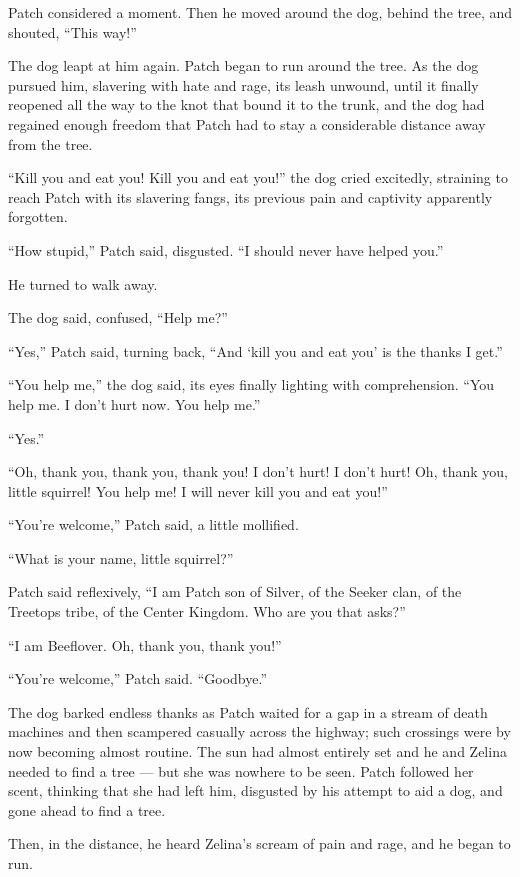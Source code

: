 \documentclass[ebook,oneside,openany,17pt]{memoir}
\begin{document}
Patch considered a moment. Then he moved around the dog, behind the
tree, and shouted, “This way!”

The dog leapt at him again. Patch began to run around the tree. As the
dog pursued him, slavering with hate and rage, its leash unwound,
until it finally reopened all the way to the knot that bound it to the
trunk, and the dog had regained enough freedom that Patch had to stay
a considerable distance away from the tree.

“Kill you and eat you! Kill you and eat you!” the dog cried excitedly,
straining to reach Patch with its slavering fangs, its previous pain
and captivity apparently forgotten.

“How stupid,” Patch said, disgusted. “I should never have helped you.”

He turned to walk away.

The dog said, confused, “Help me?”

“Yes,” Patch said, turning back, “And ‘kill you and eat you’ is the
thanks I get.”

“You help me,” the dog said, its eyes finally lighting with
comprehension. “You help me. I don’t hurt now. You help me.”

“Yes.”

“Oh, thank you, thank you, thank you! I don’t hurt! I don’t hurt! Oh,
thank you, little squirrel! You help me! I will never kill you and eat
you!”

“You’re welcome,” Patch said, a little mollified.

“What is your name, little squirrel?”

Patch said reflexively, “I am Patch son of Silver, of the Seeker clan,
of the Treetops tribe, of the Center Kingdom. Who are you that asks?”

“I am Beeflover. Oh, thank you, thank you!”

“You’re welcome,” Patch said. “Goodbye.”

The dog barked endless thanks as Patch waited for a gap in a stream of
death machines and then scampered casually across the highway; such
crossings were by now becoming almost routine. The sun had almost
entirely set and he and Zelina needed to find a tree — but she was
nowhere to be seen. Patch followed her scent, thinking that she had
left him, disgusted by his attempt to aid a dog, and gone ahead to
find a tree.

Then, in the distance, he heard Zelina’s scream of pain and rage, and
he began to run.
\end{document}
